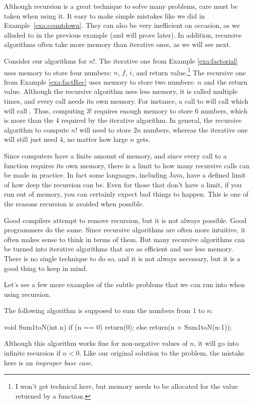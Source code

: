 Although recursion is a great technique to solve many problems, care must be taken when 
using it.  It easy to make simple mistakes like we did in Example~\ref{exa:countdown}.
They can also be very inefficient on occasion, as we alluded to in the previous example
(and will prove later).
In addition, recursive algorithms often take more memory than iterative ones, as we will see next.

\begin{exa}
Consider our algorithms for $n!$.  
The iterative one from Example \ref{exa:factorial} uses memory to store four numbers: 
$n$, $f$, $i$, and return value.\footnote{I won't get technical here,
but memory needs to be allocated for the value returned by a function.}
The recursive one from Example \ref{exa:factRec} uses memory to store two numbers: $n$ and the
return value.
Although the recursive algorithm uses less memory, it is called multiple times, and every 
call needs its own memory.  
For instance, a call to  will
call  which will call .  
Thus, computing $3!$ requires enough memory to store $6$ numbers, which is more than the $4$ required by the
iterative algorithm.  In general, the recursive algorithm to compute $n!$
will need to store $2n$ numbers, whereas the iterative one will still just need $4$, no matter
how large $n$ gets.
\end{exa}

Since computers have a finite amount of memory, and since every call to a function requires its own memory,
there is a limit to how many recursive calls can be made in practice.  
In fact some languages, including Java, have a defined limit of how deep the recursion can be.
Even for those that don't have a limit, if you run out of memory, you can certainly expect bad things to happen.
This is one of the reasons recursion is avoided when possible. 

Good compilers attempt to remove recursion, but it is not always possible.
Good programmers do the same.  Since recursive algorithms are often more intuitive, it often makes sense
to think in terms of them.  But many recursive algorithms can be turned into iterative algorithms
that are as efficient and use less memory.  There is no single technique to
do so, and it is not always necessary, but it is a good thing to keep in mind.

Let's see a few more examples of the subtle problems that we can run into when using recursion.

\begin{exa}
The following algorithm is supposed to sum the numbers from $1$ to $n$:
{\small\begin{code}
    void Sum1toN(int n) {
        if (n == 0)  return(0);
        else         return(n + Sum1toN(n-1));
    }
\end{code} 
}
Although this algorithm works fine for non-negative values of $n$, 
it will go into infinite recursion if $n<0$.
Like our original solution to the  problem, the
mistake here is an {\em improper base case}.
\end{exa}

